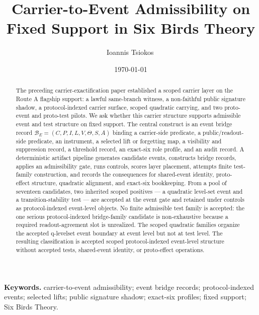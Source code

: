 \documentclass[11pt]{article}
\title{Carrier-to-Event Admissibility on Fixed Support in Six Birds Theory}
\author{Ioannis Tsiokos\,\orcidlink{0009-0009-7659-5964}}
\date{\today}
\theoremstyle{definition}
\begin{document}
\maketitle
\thispagestyle{firstpage}

\begin{abstract}
The preceding carrier-exactification paper \citep{Tsiokos2026CarrierExactification} established a scoped carrier layer on the Route A flagship support: a lawful same-branch witness, a non-faithful public signature shadow, a protocol-indexed carrier surface, scoped quadratic carrying, and two proto-event and proto-test pilots. We ask whether this carrier structure supports admissible event and test structure on fixed support. The central construct is an event bridge record \(\mathcal B_E=(C,P,I,L,V,\Theta,S,A)\) binding a carrier-side predicate, a public/readout-side predicate, an instrument, a selected lift or forgetting map, a visibility and suppression record, a threshold record, an exact-six role profile, and an audit record. A deterministic artifact pipeline generates candidate events, constructs bridge records, applies an admissibility gate, runs controls, scores layer placement, attempts finite test-family construction, and records the consequences for shared-event identity, proto-effect structure, quadratic alignment, and exact-six bookkeeping. From a pool of seventeen candidates, two inherited scoped positives --- a quadratic level-set event and a transition-stability test --- are accepted at the event gate and retained under controls as protocol-indexed event-level objects. No finite admissible test family is accepted: the one serious protocol-indexed bridge-family candidate is non-exhaustive because a required readout-agreement slot is unrealized. The scoped quadratic families organize the accepted q-levelset event boundary at event level but not at test level. The resulting classification is accepted scoped protocol-indexed event-level structure without accepted tests, shared-event identity, or proto-effect operations.
\end{abstract}

\medskip
\noindent\textbf{Keywords.} carrier-to-event admissibility; event bridge records; protocol-indexed events; selected lifts; public signature shadow; exact-six profiles; fixed support; Six Birds Theory.
\end{document}
